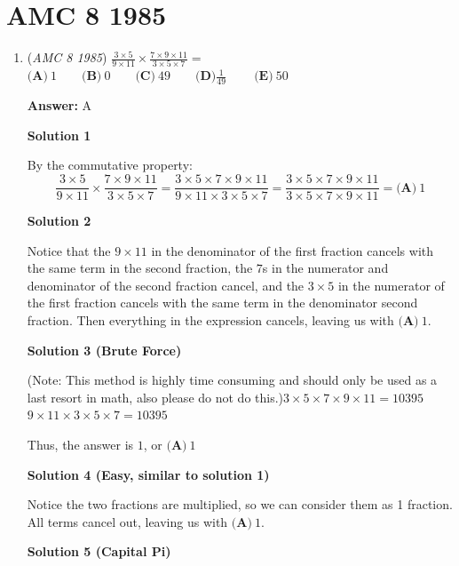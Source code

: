 \section{AMC 8 1985}
        \begin{enumerate}
        	\item (\textit{AMC 8 1985}) $\frac{3\times 5}{9\times 11}\times \frac{7\times 9\times 11}{3\times 5\times 7}=$
$\textbf{(A)}\ 1 \qquad \textbf{(B)}\ 0 \qquad \textbf{(C)}\ 49 \qquad \textbf{(D)} \frac{1}{49}\ \qquad \textbf{(E)}\ 50$

 \textbf{Answer: }A



\textbf{Solution 1}

By the commutative property: 
 \[\frac{3\times 5}{9\times 11}\times \frac{7\times 9\times 11}{3\times 5\times 7}=\frac{3\times 5\times 7 \times 9 \times 11}{9\times 11\times 3 \times 5 \times 7}= \frac{3\times 5 \times 7 \times 9 \times 11}{3\times 5 \times 7 \times 9 \times 11}=\boxed{\textbf{(A)}~1}\]




\textbf{Solution 2}

Notice that the $9 \times 11$ in the denominator of the first fraction cancels with the same term in the second fraction, the $7$s in the numerator and denominator of the second fraction cancel, and the $3 \times 5$ in the numerator of the first fraction cancels with the same term in the denominator second fraction. Then everything in the expression cancels, leaving us with $\boxed{\textbf{(A)}~1}$.

 



\textbf{Solution 3 (Brute Force)}

(Note: This method is highly time consuming and should only be used as a last resort in math, also please do not do this.)$3 \times 5 \times 7 \times 9 \times 11 = 10395$
$9 \times 11 \times 3 \times 5 \times 7 = 10395$

 Thus, the answer is $1$, or $\boxed{\textbf{(A)}\ 1}$




\textbf{Solution 4 (Easy, similar to solution 1)}

Notice the two fractions are multiplied, so we can consider them as 1 fraction. All terms cancel out, leaving us with $\boxed{\textbf{(A)}~1}$.

 



\textbf{Solution 5 (Capital Pi)}


\end{enumerate}
